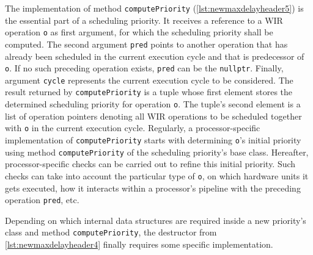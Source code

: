 The implementation of method \texttt{computePriority} (\cref{lst:newmaxdelayheader5}) is the essential part of a scheduling priority.
It receives a reference to a \gls{WIR} operation \texttt{o} as first argument, for which the scheduling priority shall be computed.
The second argument \texttt{pred} points to another operation that has already been scheduled in the current execution cycle and that is predecessor of \texttt{o}.
If no such preceding operation exists, \texttt{pred} can be the \texttt{nullptr}.
Finally, argument \texttt{cycle} represents the current execution cycle to be considered.
The result returned by \texttt{computePriority} is a tuple whose first element stores the determined scheduling priority for operation \texttt{o}.
The tuple's second element is a list of operation pointers denoting all \gls{WIR} operations to be scheduled together with \texttt{o} in the current execution cycle.
Regularly, a processor-specific implementation of \texttt{computePriority} starts with determining \texttt{o}'s initial priority using method \texttt{computePriority} of the scheduling priority's base class.
Hereafter, processor-specific checks can be carried out to refine this initial priority.
Such checks can take into account the particular type of \texttt{o}, on which hardware units it gets executed, how it interacts within a processor's pipeline with the preceding operation \texttt{pred}, etc.

Depending on which internal data structures are required inside a new priority's class and method \texttt{computePrio\-rity}, the destructor from \cref{lst:newmaxdelayheader4} finally requires some specific implementation.

